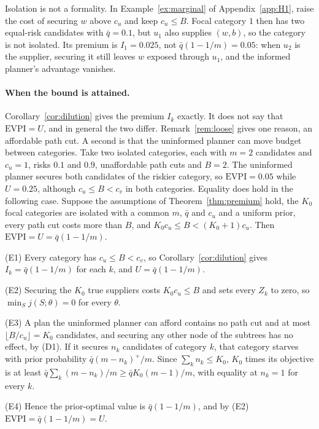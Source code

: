 \documentclass[pdflatex,sn-mathphys-num]{sn-jnl}
\theoremstyle{thmstyleone}
\theoremstyle{thmstyletwo}
\theoremstyle{thmstylethree}
\newcommand{\evpi}{\mathrm{EVPI}}
\newcommand{\ubound}{U}
\begin{document}
Isolation is not a formality. In Example~\ref{ex:marginal} of
Appendix~\ref{app:H1}, raise the cost of securing $w$ above $c_u$ and keep
$c_u\le B$. Focal category $1$ then has two equal-risk candidates with
$\bar q=0.1$, but $u_1$ also supplies $(w,b)$, so the category is not
isolated. Its premium is $I_1=0.025$, not $\bar q(1-1/m)=0.05$: when $u_2$ is
the supplier, securing it still leaves $w$ exposed through $u_1$, and the
informed planner's advantage vanishes.

\paragraph{When the bound is attained.} Corollary~\ref{cor:dilution} gives
the premium $I_k$ exactly. It does not say that $\evpi=\ubound$, and in
general the two differ. Remark~\ref{rem:loose} gives one reason, an
affordable path cut. A second is that the uninformed planner can move budget
between categories. Take two isolated categories, each with $m=2$ candidates
and $c_u=1$, risks $0.1$ and $0.9$, unaffordable path cuts and $B=2$. The
uninformed planner secures both candidates of the riskier category, so
$\evpi=0.05$ while $\ubound=0.25$, although $c_u\le B<c_v$ in both
categories. Equality does hold in the following case. Suppose the
assumptions of Theorem~\ref{thm:premium} hold, the $K_0$ focal categories
are isolated with a common $m$, $\bar q$ and $c_u$ and a uniform prior, every
path cut costs more than $B$, and $K_0c_u\le B<(K_0+1)c_u$. Then
$\evpi=\ubound=\bar q(1-1/m)$.

\noindent(E1) Every category has $c_u\le B<c_v$, so
Corollary~\ref{cor:dilution} gives $I_k=\bar q(1-1/m)$ for each $k$, and
$\ubound=\bar q(1-1/m)$.

\noindent(E2) Securing the $K_0$ true suppliers costs $K_0c_u\le B$ and sets
every $Z_k$ to zero, so $\min_Sj(S;\theta)=0$ for every $\theta$.

\noindent(E3) A plan the uninformed planner can afford contains no path cut
and at most $\lfloor B/c_u\rfloor=K_0$ candidates, and securing any other
node of the subtrees has no effect, by (D1). If it secures $n_k$ candidates
of category $k$, that category starves with prior probability
$\bar q(m-n_k)^+/m$. Since $\sum_kn_k\le K_0$, $K_0$ times its objective is
at least $\bar q\sum_k(m-n_k)/m\ge\bar qK_0(m-1)/m$, with equality at
$n_k=1$ for every $k$.

\noindent(E4) Hence the prior-optimal value is $\bar q(1-1/m)$, and by (E2)
$\evpi=\bar q(1-1/m)=\ubound$.
\end{document}
